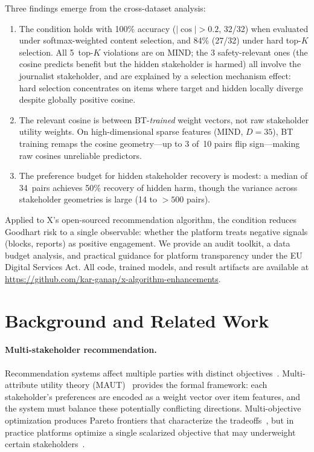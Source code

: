 \documentclass[11pt,letterpaper]{article}
\begin{document}
Three findings emerge from the cross-dataset analysis:
\begin{enumerate}
  \item The condition holds with 100\% accuracy ($|\cos| > 0.2$,
    32/32) when evaluated under softmax-weighted content selection,
    and 84\% (27/32) under hard top-$K$ selection. All 5~top-$K$
    violations are on MIND; the 3 safety-relevant ones (the cosine
    predicts benefit but the hidden stakeholder is harmed) all involve
    the journalist stakeholder, and are explained by a selection
    mechanism effect: hard selection concentrates on items where target
    and hidden locally diverge despite globally positive cosine.
  \item The relevant cosine is between BT-\emph{trained} weight
    vectors, not raw stakeholder utility weights. On high-dimensional
    sparse features (MIND, $D{=}35$), BT training remaps the cosine
    geometry---up to 3 of~10 pairs flip sign---making raw cosines
    unreliable predictors.
  \item The preference budget for hidden stakeholder recovery is
    modest: a median of 34~pairs achieves 50\% recovery of hidden
    harm, though the variance across stakeholder geometries is large
    (14 to $>500$ pairs).
\end{enumerate}

Applied to X's open-sourced recommendation algorithm, the condition
reduces Goodhart risk to a single observable: whether the platform
treats negative signals (blocks, reports) as positive engagement. We
provide an audit toolkit, a data budget analysis, and practical
guidance for platform transparency under the EU Digital Services Act.
All code, trained models, and result artifacts are available at
\url{https://github.com/kar-ganap/x-algorithm-enhancements}.

\section{Background and Related Work}
\label{sec:background}

\paragraph{Multi-stakeholder recommendation.}
Recommendation systems affect multiple parties with distinct
objectives~\cite{burke2017multistakeholder}. Multi-attribute utility
theory (MAUT)~\cite{keeney1976decisions} provides the formal
framework: each stakeholder's preferences are encoded as a weight
vector over item features, and the system must balance these
potentially conflicting directions. Multi-objective optimization
produces Pareto frontiers that characterize the
tradeoffs~\cite{iancu2014pareto}, but in practice platforms optimize
a single scalarized objective that may underweight certain
stakeholders~\cite{stray2024building}.
\end{document}
